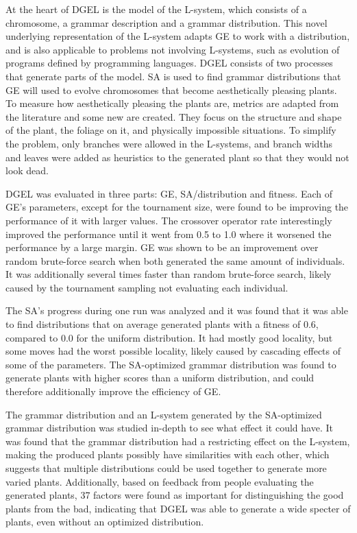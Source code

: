 At the heart of \gls{DGEL} is the model of the \gls{L-system}, which consists of a chromosome, a grammar description and a grammar distribution.
This novel underlying representation of the \gls{L-system} adapts \gls{GE} to work with a distribution, and is also applicable to problems not involving \glspl{L-system}, such as evolution of programs defined by programming languages.
\gls{DGEL} consists of two processes that generate parts of the model.
\gls{SA} is used to find grammar distributions that \gls{GE} will used to evolve chromosomes that become aesthetically pleasing plants.
To measure how aesthetically pleasing the plants are, metrics are adapted from the literature and some new are created.
They focus on the structure and shape of the plant, the foliage on it, and physically impossible situations.
To simplify the problem, only branches were allowed in the \glspl{L-system}, and branch widths and leaves were added as heuristics to the generated plant so that they would not look dead.

\gls{DGEL} was evaluated in three parts: \gls{GE}, \gls{SA}/distribution and fitness.
Each of \gls{GE}'s parameters, except for the tournament size, were found to be improving the performance of it with larger values.
The crossover operator rate interestingly improved the performance until it went from 0.5 to 1.0 where it worsened the performance by a large margin.
\gls{GE} was shown to be an improvement over random brute-force search when both generated the same amount of individuals.
It was additionally several times faster than random brute-force search, likely caused by the tournament sampling not evaluating each individual.

The \gls{SA}'s progress during one run was analyzed and it was found that it was able to find distributions that on average generated plants with a fitness of 0.6, compared to 0.0 for the uniform distribution.
It had mostly good locality, but some moves had the worst possible locality, likely caused by cascading effects of some of the parameters.
The \gls{SA}-optimized grammar distribution was found to generate plants with higher scores than a uniform distribution, and could therefore additionally improve the efficiency of \gls{GE}.

The grammar distribution and an \gls{L-system} generated by the \gls{SA}-optimized grammar distribution was studied in-depth to see what effect it could have.
It was found that the grammar distribution had a restricting effect on the \gls{L-system}, making the produced plants possibly have similarities with each other, which suggests that multiple distributions could be used together to generate more varied plants.
Additionally, based on feedback from people evaluating the generated plants, 37 factors were found as important for distinguishing the good plants from the bad, indicating that \gls{DGEL} was able to generate a wide specter of plants, even without an optimized distribution.

